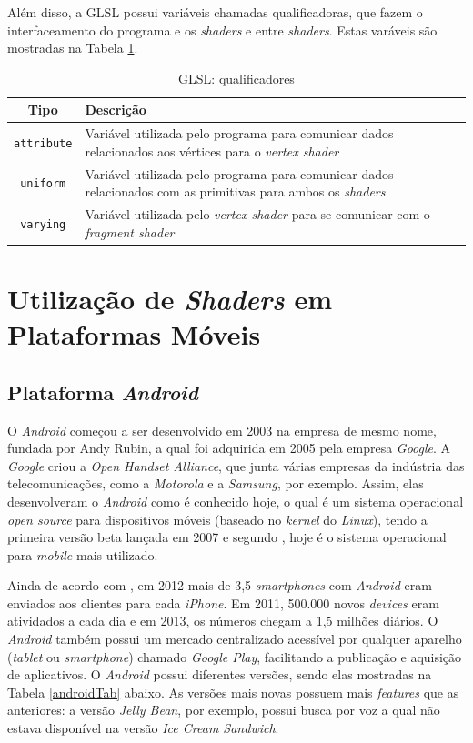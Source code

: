	Além disso, a GLSL possui variáveis chamadas qualificadoras, que fazem o interfaceamento do programa e os \textit{shaders} e entre \textit{shaders}. Estas varáveis são mostradas na Tabela \ref{tiposqualificadores}.

	\begin{table}[h]
	\centering	
	\begin{tabularx}{0.9\textwidth}{cX}
		\toprule
		\textbf{Tipo} & \textbf{Descrição}  \\
		\midrule
		\texttt{attribute} &  Variável utilizada pelo programa para comunicar dados relacionados aos vértices para o \textit{vertex shader}\\
		\texttt{uniform} &  Variável utilizada pelo programa para comunicar dados relacionados com as primitivas para ambos os \textit{shaders} \\
		\texttt{varying} &  Variável utilizada pelo \textit{vertex shader} para se comunicar com o \textit{fragment shader} \\
		\bottomrule
	\end{tabularx}
	\caption{ GLSL: qualificadores}
	\label{tiposqualificadores}
	\end{table}

\section{Utilização de \textit{Shaders} em Plataformas Móveis}

	\subsection{Plataforma \textit{Android}}

	O \textit{Android} começou a ser desenvolvido em 2003 na empresa de mesmo nome, fundada por Andy Rubin, a qual foi adquirida em 2005 pela empresa \textit{Google}. A \textit{Google} criou a \textit{Open Handset Alliance}, que junta várias empresas da indústria das telecomunicações, como a \textit{Motorola} e a \textit{Samsung}, por exemplo. Assim, elas desenvolveram o \textit{Android} como é conhecido hoje, o qual é um sistema operacional  \textit{open source} para dispositivos móveis (baseado no \textit{kernel} do \textit{Linux}), tendo a primeira versão beta lançada em 2007 e segundo \cite{android2013}, hoje é o sistema operacional para \textit{mobile} mais utilizado.

	 Ainda de acordo com \cite{android2013}, em 2012 mais de 3,5 \textit{smartphones} com \textit{Android} eram enviados aos clientes para cada \textit{iPhone}. Em 2011, 500.000 novos \textit{devices} eram atividados a cada dia e em 2013, os números chegam a 1,5 milhões diários. O \textit{Android} também possui um mercado centralizado acessível por qualquer aparelho (\textit{tablet} ou \textit{smartphone}) chamado \textit{Google Play}, facilitando a publicação e aquisição de aplicativos. 
	O \textit{Android}  possui diferentes versões, sendo elas mostradas na Tabela \ref{androidTab} abaixo.  As versões mais novas possuem mais \textit{features} que as anteriores: a versão \textit{Jelly Bean}, por exemplo, possui busca por voz a qual não estava disponível na versão \textit{Ice Cream Sandwich}. 

